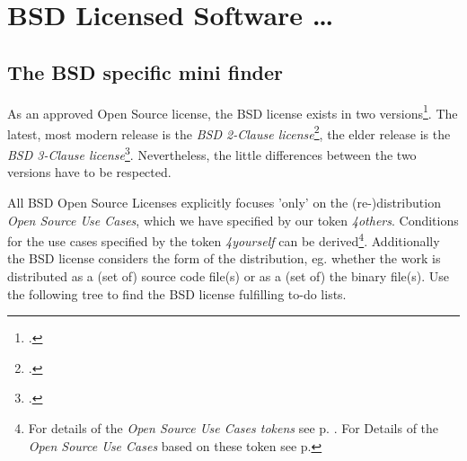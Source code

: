 %
%
%
%
%



\section{BSD Licensed Software \ldots}

\subsection{The BSD specific mini finder}

As an approved Open Source license, the BSD license exists in two
versions\footcite[Following the Open Source Initiative, initially a not approved
BSD license contained a fourth clause also known as advertising clause which
\enquote{(\ldots) officially was rescinded by the Director of the Office of
Technology Licensing of the University of California on July 22nd, 1999}.
 Cf.][\nopage wp. Because of the cancellation you can simply act according the
 \textit{BSD 3-Clause license} if you have to fulfill the eldest BSD
 license]{BsdLicense3Clause}. The latest, most modern release is the \textit{BSD
 2-Clause license}\footcite[cf.][\nopage wp]{BsdLicense2Clause}, the elder
 release is the \textit{BSD 3-Clause license}\footcite[cf.][\nopage
 wp]{BsdLicense3Clause}. Nevertheless, the little differences between the
 two versions have to be respected.

All BSD Open Source Licenses explicitly focuses 'only' on the (re-)distribution
\textit{Open Source Use Cases}, which we have specified by our token
\textit{4others}. Conditions for the use cases specified by the token
\textit{4yourself} can be derived\footnote{For details of the \textit{Open
Source Use Cases tokens} see p. \pageref{OsucTokens}. For Details of the
\textit{Open Source Use Cases} based on these token see p.
\pageref{OsucDefinitionTree} }. Additionally the BSD license considers the form
of the distribution, eg. whether the work is distributed as a (set of) source
code file(s) or as a (set of) the binary file(s). Use the following tree to find
the BSD license fulfilling to-do lists.

